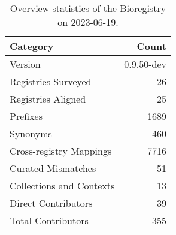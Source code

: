 \begin{table}
\caption{Overview statistics of the Bioregistry on 2023-06-19.}
\label{tab:bioregistry-summary}
\begin{tabular}{lr}
\toprule
Category & Count \\
\midrule
Version & 0.9.50-dev \\
Registries Surveyed & 26 \\
Registries Aligned & 25 \\
Prefixes & 1689 \\
Synonyms & 460 \\
Cross-registry Mappings & 7716 \\
Curated Mismatches & 51 \\
Collections and Contexts & 13 \\
Direct Contributors & 39 \\
Total Contributors & 355 \\
\bottomrule
\end{tabular}
\end{table}
